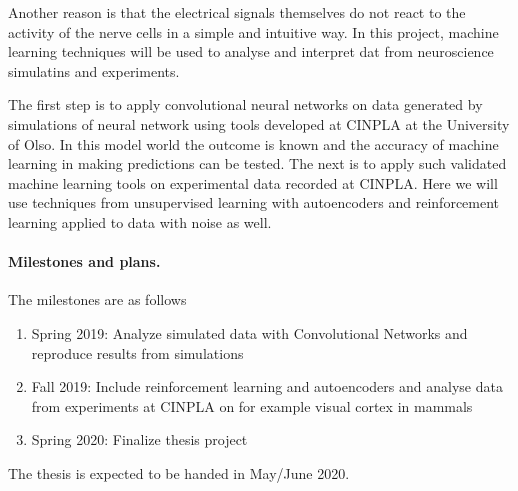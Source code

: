 \documentclass[%
oneside,                 %
final,                   %
10pt]{article}
\begin{document}
Another reason is that the electrical signals themselves do not react
to the activity of the nerve cells in a simple and intuitive way.  In
this project, machine learning techniques will be used to analyse and
interpret dat from neuroscience simulatins and experiments.

The first step is to apply convolutional neural networks on data
generated by simulations of neural network using tools developed at
CINPLA at the University of Olso. In this model world the outcome is
known and the accuracy of machine learning in making predictions can
be tested. The next is to apply such validated machine learning tools
on experimental data recorded at CINPLA.  Here we will use techniques
from unsupervised learning with autoencoders and reinforcement
learning applied to data with noise as well.

\paragraph{Milestones and plans.}
The milestones are as follows
\begin{enumerate}
\item Spring 2019: Analyze simulated data with Convolutional Networks and reproduce results from simulations

\item Fall 2019: Include reinforcement learning and autoencoders and analyse data from experiments at CINPLA on for example visual cortex in mammals

\item Spring 2020: Finalize thesis project
\end{enumerate}

\noindent
The thesis is expected to be handed in May/June  2020.



\end{document}
